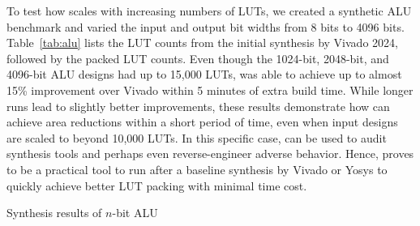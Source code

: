 To test how \shortname{} scales with increasing numbers of LUTs, we created a
synthetic ALU benchmark and varied the input and output bit widths from 8 bits
to 4096 bits. Table~\ref{tab:alu} lists the LUT counts from the initial
synthesis by Vivado 2024, followed by the packed LUT counts. Even though the
1024-bit, 2048-bit, and 4096-bit ALU designs had up to 15,000 LUTs,
\shortname{} was able to achieve up to almost 15\% improvement over Vivado
within 5 minutes of extra build time. While longer runs lead to slightly better
improvements, these results demonstrate how \shortname{} can achieve area
reductions within a short period of time, even when input designs are scaled to
beyond 10,000 LUTs. In this specific case, \shortname{} can be used to audit
synthesis tools and perhaps even reverse-engineer adverse behavior. Hence,
\shortname{} proves to be a practical tool to run after a baseline synthesis by
Vivado or Yosys to quickly achieve better LUT packing with minimal time cost.

\begin{table}
    \centering
    \caption{Synthesis results of $n$-bit ALU}\label{tab:alu}
\end{table}